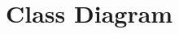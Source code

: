 \documentclass[11pt]{article}
\begin{document}
\begin{tikzpicture}
\end{tikzpicture}


\section{Class Diagram}
\label{sec:org9c4eb00}
\end{document}
